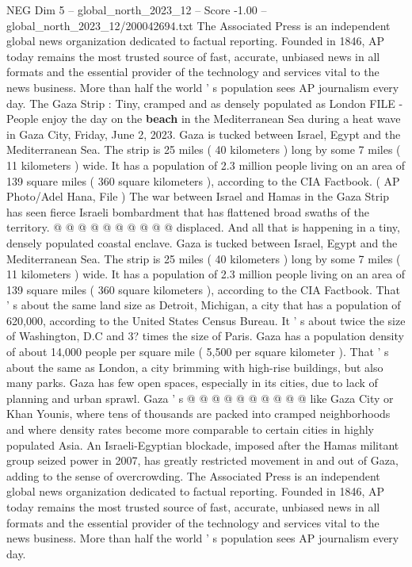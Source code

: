 \begin{textsample}{NEG Dim 5 – global\_north\_2023\_12 – Score -1.00 – global\_north\_2023\_12/200042694.txt}  \label{ex:f5_neg_112}
The Associated Press is an independent global news organization dedicated to factual reporting.
Founded in 1846, AP today remains the most trusted source of fast, accurate, unbiased news in all formats and the essential provider of the technology and services vital to the news business.
More than half the world ' s population sees AP journalism every day.
The Gaza Strip : Tiny, cramped and as densely populated as London FILE - People enjoy the day on the \textbf{beach} in the Mediterranean Sea during a heat wave in Gaza City, Friday, June 2, 2023.
Gaza is tucked between Israel, Egypt and the Mediterranean Sea.
The strip is 25 miles ( 40 kilometers ) long by some 7 miles ( 11 kilometers ) wide.
It has a population of 2.3 million people living on an area of 139 square miles ( 360 square kilometers ), according to the CIA Factbook. ( AP Photo/Adel Hana, File ) The war between Israel and Hamas in the Gaza Strip has seen fierce Israeli bombardment that has flattened broad swaths of the territory. @ @ @ @ @ @ @ @ @ @ displaced.
And all that is happening in a tiny, densely populated coastal enclave.
Gaza is tucked between Israel, Egypt and the Mediterranean Sea.
The strip is 25 miles ( 40 kilometers ) long by some 7 miles ( 11 kilometers ) wide.
It has a population of 2.3 million people living on an area of 139 square miles ( 360 square kilometers ), according to the CIA Factbook.
That ' s about the same land size as Detroit, Michigan, a city that has a population of 620,000, according to the United States Census Bureau.
It ' s about twice the size of Washington, D.C and 3? times the size of Paris.
Gaza has a population density of about 14,000 people per square mile ( 5,500 per square kilometer ).
That ' s about the same as London, a city brimming with high-rise buildings, but also many parks.
Gaza has few open spaces, especially in its cities, due to lack of planning and urban sprawl.
Gaza ' s @ @ @ @ @ @ @ @ @ @ like Gaza City or Khan Younis, where tens of thousands are packed into cramped neighborhoods and where density rates become more comparable to certain cities in highly populated Asia.
An Israeli-Egyptian blockade, imposed after the Hamas militant group seized power in 2007, has greatly restricted movement in and out of Gaza, adding to the sense of overcrowding.
The Associated Press is an independent global news organization dedicated to factual reporting.
Founded in 1846, AP today remains the most trusted source of fast, accurate, unbiased news in all formats and the essential provider of the technology and services vital to the news business.
More than half the world ' s population sees AP journalism every day.

\end{textsample}
